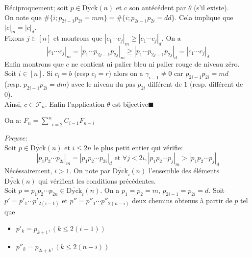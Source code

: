 Réciproquement; soit $p\in \overline{\text{Dyck}}(n) $ et c son antécédent par $\theta$	(s'il existe).\\ On note que $\#\{i; p_{2i-1}p_{2i}=mm\} = \#\{i; p_{2i-1}p_{2i}=dd\}$. Cela implique que $|c|_{m} = |c|_{d}$.\\
Fixons $j\in [n]$ et montrons que $| c_{1}\cdots c_{j} |_{m}\geq | c_{1}\cdots c_{j} |_{d}$. On a \vspace{5pt}
\[
	| c_{1}\cdots c_{j} |_{m} = |  p_{1}\cdots p_{2j-1}p_{2j} |_{m} \geq | p_{1}\cdots p_{2j-1}p_{2j} |_{d} = | c_{1}\cdots c_{j} |_{d}
\]
\text{}\vspace{5pt}
Enfin montrons que $c$ ne contient ni palier bleu ni palier rouge de niveau zéro. \\
Soit $i\in [n]$. Si $c_{i}=b$ (resp $c_{i}=r$) alors on a $\gamma_{i-1}\neq 0$ car $p_{2i-1}p_{2i}=md$ \\ (resp. $p_{2i-1}p_{2i}=dm$) avec le niveau du pas $p_{2i}$ différent de $1$ (resp. différent de 0).\\
Ainsi, $c\in \mathcal{F}_{n}$. Enfin l'application $\theta$ est bijective\hspace{10pt}$\blacksquare$
\begin{proposition}
	On a: $ F_{n} = \underset{i=2}{\overset{n}{\sum}}C_{i-1}F_{n-i} $
\end{proposition}
$\underline{\textit{Preuve}}$:\\
Soit $p \in  \overline{\text{Dyck}}(n)$ et $i \leq 2n$ le plus petit entier qui vérifie:
$$|p_{1}p_{2}\cdots p_{2i}|_{m} = |p_{1}p_{2}\cdots p_{2i}|_{d} \text{ et } \forall j<2i, |p_{1}p_{2}\cdots p_{j}|_{m}>|p_{1}p_{2}\cdots p_{j}|_{d}$$
Nécéssairement, $i > 1$. On note par $\overline{\text{Dyck}}_{i}(n)$ l'ensemble des éléments $\overline{\text{Dyck}}(n)$ qui vérifient les conditions précédentes. \\
Soit $p=p_{1}p_{2}\cdots p_{2n} \in \overline{\text{Dyck}}_{i}(n)$. On a $p_{1} = p_{2} = m$,  $p_{2i-1} = p_{2i} = d$. Soit $p'=p'_{1}\cdots p'_{2(i-1)}$ et $p''=p''_{1} \cdots p''_{2(n-i)}$ deux chemins obtenus à partir de $p$ tel que
\begin{itemize}
	\item $p'_{k}=p_{k+1}, (k\leq 2(i-1))$
	\item $p''_{k}=p_{2i+k}, (k\leq 2(n-i))$
\end{itemize}
